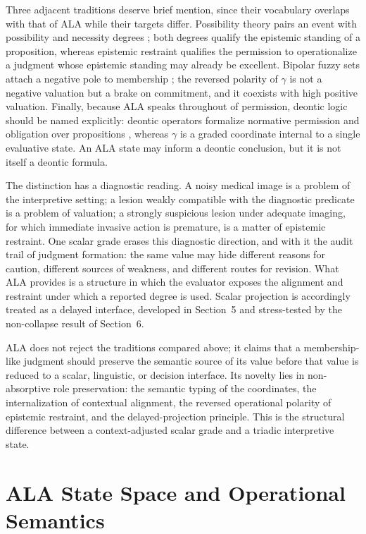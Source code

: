 \documentclass[reqno,final]{amsart}
\theoremstyle{definition}
\theoremstyle{plain}
\theoremstyle{remark}
\begin{document}
Three adjacent traditions deserve brief mention, since their vocabulary overlaps with that of ALA while their targets differ. Possibility theory pairs an event with possibility and necessity degrees \cite{DuboisPrade1988}; both degrees qualify the epistemic standing of a proposition, whereas epistemic restraint qualifies the permission to operationalize a judgment whose epistemic standing may already be excellent. Bipolar fuzzy sets attach a negative pole to membership \cite{ZhangBipolar1994}; the reversed polarity of \(\gamma\) is not a negative valuation but a brake on commitment, and it coexists with high positive valuation. Finally, because ALA speaks throughout of permission, deontic logic should be named explicitly: deontic operators formalize normative permission and obligation over propositions \cite{vonWright1951}, whereas \(\gamma\) is a graded coordinate internal to a single evaluative state. An ALA state may inform a deontic conclusion, but it is not itself a deontic formula.

The distinction has a diagnostic reading. A noisy medical image is a problem of the interpretive setting; a lesion weakly compatible with the diagnostic predicate is a problem of valuation; a strongly suspicious lesion under adequate imaging, for which immediate invasive action is premature, is a matter of epistemic restraint. One scalar grade erases this diagnostic direction, and with it the audit trail of judgment formation: the same value may hide different reasons for caution, different sources of weakness, and different routes for revision. What ALA provides is a structure in which the evaluator exposes the alignment and restraint under which a reported degree is used. Scalar projection is accordingly treated as a delayed interface, developed in Section~5 and stress-tested by the non-collapse result of Section~6.

ALA does not reject the traditions compared above; it claims that a membership-like judgment should preserve the semantic source of its value before that value is reduced to a scalar, linguistic, or decision interface. Its novelty lies in non-absorptive role preservation: the semantic typing of the coordinates, the internalization of contextual alignment, the reversed operational polarity of epistemic restraint, and the delayed-projection principle. This is the structural difference between a context-adjusted scalar grade and a triadic interpretive state.


\section{ALA State Space and Operational Semantics}
\label{sec:ala-state-space}
\end{document}
